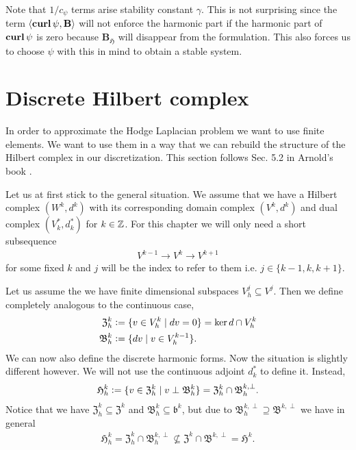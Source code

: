 \documentclass[../master_thesis.tex]{subfiles}
\begin{document}
Note that $1/c_\psi$ terms arise
stability constant $\gamma$. This is not surprising since the term 
$\langle \veccurl \psi, \mathbf{B} \rangle$ will not enforce the harmonic 
part if the harmonic part of $\veccurl \psi$ is zero because 
$\mathbf{B}_\mathfrak{H}$ will disappear from the formulation.
This also forces us to choose $\psi$ with this in mind to obtain a 
stable system.

\section{Discrete Hilbert complex}

In order to approximate the Hodge Laplacian problem we want to use finite elements.
We want to use them in a way that we can rebuild the structure of the Hilbert complex 
in our discretization. This section follows Sec. 5.2 in Arnold's book \cite{arnold}.

Let us at first stick to the general situation. We assume that we have a Hilbert complex 
$(W^k,d^k)$ with its corresponding domain complex 
$(V^k,d^k)$ and dual complex $(V^*_k,d^*_k)$ for $k \in \mathbb{Z}$. For this chapter 
we will only need a short subsequence 
\begin{align*}
    V^{k-1} \rightarrow V^k \rightarrow V^{k+1}
\end{align*}
for some fixed $k$ and $j$ will be the index to refer to them i.e. 
$j \in \{k-1,k,k+1\}$.

Let us assume the we have finite dimensional subspaces $V_h^j \subseteq V^j$. 
Then we define completely analogous to the continuous case,
\begin{align*}
    \mathfrak{Z}_h^k &\vcentcolon= \{ v \in V_h^k \mid d v = 0 \} = \ker d \cap V^k_h
    \\ \mathfrak{B}^k_h &\vcentcolon= \{ dv \mid v \in V_h^{k-1} \}.
\end{align*}
We can now also define the discrete harmonic forms. Now the situation is slightly 
different however. We will not use the continuous adjoint $d^*_k$ to define it.
Instead,
\begin{align*}
    \mathfrak{H}_h^k \vcentcolon= \{ v \in \mathfrak{Z}_h^k \mid v \perp \mathfrak{B}^k_h \}
        = \mathfrak{Z}_h^k \cap \mathfrak{B}_h^{k,\perp}.
\end{align*}
Notice that we have $\mathfrak{Z}_h^k \subseteq \mathfrak{Z}^k$ and 
$\mathfrak{B}_h^k \subseteq \mathfrak{b}^k$, but due to 
$\mathfrak{B}_h^{k,\perp} \supseteq \mathfrak{B}^{k,\perp}$ we have in general
\begin{align*}
    \mathfrak{H}^k_h = \mathfrak{Z}_h^k \cap \mathfrak{B}_h^{k,\perp} 
    \not\subseteq    \mathfrak{Z}^k \cap \mathfrak{B}^{k,\perp} = \mathfrak{H}^k.
\end{align*}
\end{document}
